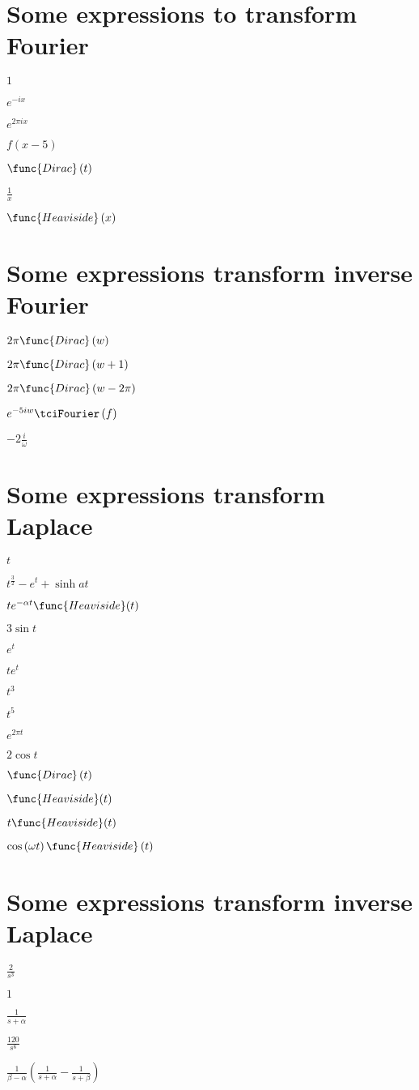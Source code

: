 \documentclass{article}
\begin{document}
\section{Some expressions to transform Fourier}

$1$

$e^{-ix}$

$e^{2\pi ix}$

$f\left( x-5\right) $

$\func{Dirac}\left( t\right) $

$\frac{1}{x}$

$\func{Heaviside}\left( x\right) $

\section{Some expressions transform inverse Fourier}

$2\pi \func{Dirac}\left( w\right) $

$2\pi \func{Dirac}\left( w+1\right) $

$2\pi \func{Dirac}\left( w-2\pi \right) $

$e^{-5iw}\tciFourier \left( f\right) $

$-2\frac{i}{\omega }$

\section{Some expressions transform Laplace}

$t$

$t^{\frac{3}{2}}-e^{t}+\sinh at$

$te^{-\alpha t}\func{Heaviside}(t)$

$3\sin t$

$e^{t}$

$te^{t}$

$t^{3}$

$t^{5}$

$e^{2\pi t}$

$2\cos t$

$\func{Dirac}\left( t\right) $

$\func{Heaviside}(t)$

$t\func{Heaviside}(t)$

$\cos \left( \omega t\right) \func{Heaviside}\left( t\right) $

\section{Some expressions transform inverse Laplace}

$\frac{2}{s^{3}}$

$1$

$\frac{1}{s+\alpha }$

$\frac{120}{s^{6}}$

$\frac{1}{\beta -\alpha }\left( \frac{1}{s+\alpha }-\frac{1}{s+\beta }%
\right) $
\end{document}
